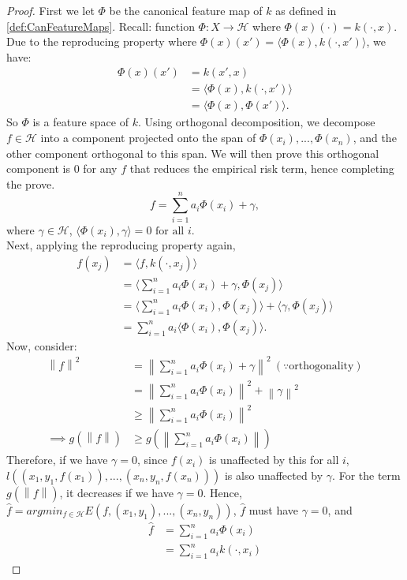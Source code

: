 \documentclass[english]{article}
\newcommand\norm[1]{\left\lVert#1\right\rVert}
\newcommand\inner[1]{\langle#1\rangle}
\begin{document}
\begin{proof}
	First we let $\Phi$ be the canonical feature map of $k$ as defined in \ref{def:CanFeatureMaps}. Recall: function $\Phi: X \rightarrow \mathcal{H}$ where $\Phi(x)(\cdot) = k(\cdot , x)$. Due to the reproducing property where $\Phi(x)(x') = \inner{\Phi(x), k(\cdot, x')}$, we have:
	\begin{equation*}
	\begin{split}
		\Phi(x)(x') &= k(x', x) \\
			&= \inner{\Phi(x), k(\cdot, x')} \\
			&= \inner{\Phi(x), \Phi(x')}. 
	\end{split}
	\end{equation*}
	So $\Phi$ is a feature space of $k$. Using orthogonal decomposition, we decompose $f \in \mathcal{H}$ into a component projected onto the span of ${\Phi(x_i), ..., \Phi(x_n)}$, and the other component orthogonal to this span. We will then prove this orthogonal component is $0$ for any $f$ that reduces the empirical risk  term, hence completing the prove.
	\[ f = \sum_{i=1}^{n} a_i \Phi(x_i) + \gamma, \]
	where $\gamma \in \mathcal{H}$, $\inner{\Phi(x_i), \gamma} = 0 \text{ for all } i$.\\
	Next, applying the reproducing property again,
	\begin{equation*}
	\begin{split}
	f(x_j) &= \inner{f, k(\cdot, x_j)} \\
	&= \inner{\sum_{i=1}^{n} a_i \Phi(x_i) + \gamma, \Phi(x_j)} \\
	&= \inner{\sum_{i=1}^{n} a_i \Phi(x_i),  \Phi(x_j)} + \inner{\gamma,  \Phi(x_j)} \\
	&= \sum_{i=1}^{n} a_i \inner{\Phi(x_i),  \Phi(x_j)}.
	\end{split}
	\end{equation*}
	Now, consider:
	\begin{equation*}
	\begin{split}
	\norm{f}^2 &= \norm{\sum_{i=1}^{n} a_i \Phi(x_i) + \gamma}^2 ~ (\because \text{orthogonality})\\
	&=  \norm{\sum_{i=1}^{n} a_i \Phi(x_i)}^2 + \norm{\gamma}^2 \\
	&\geq \norm{\sum_{i=1}^{n} a_i \Phi(x_i)}^2 \\
	\implies g(\norm{f}) &\geq g(\norm{\sum_{i=1}^{n} a_i \Phi(x_i)})
	\end{split}
	\end{equation*}
	Therefore, if we have $\gamma = 0$, since $f(x_i)$ is unaffected by this for all $i$, 
	$l((x_1, y_1, f(x_1)), ..., (x_n, y_n, f(x_n)))$ is also unaffected by $\gamma$. For the term $g(\norm{f})$, it decreases if we have $\gamma = 0$. Hence,  $\hat{f} = argmin_{f \in \mathcal{H}} E(f, (x_1, y_1), ..., (x_n, y_n))$, $\hat{f}$ must have $\gamma = 0$, and 
	\begin{equation*}
	\begin{split}
	\hat{f} &= \sum_{i=1}^{n} a_i \Phi(x_i) \\
		&=  \sum_{i=1}^{n} a_i k(\cdot, x_i)
	\end{split}
	\end{equation*}
\end{proof}
\end{document}
